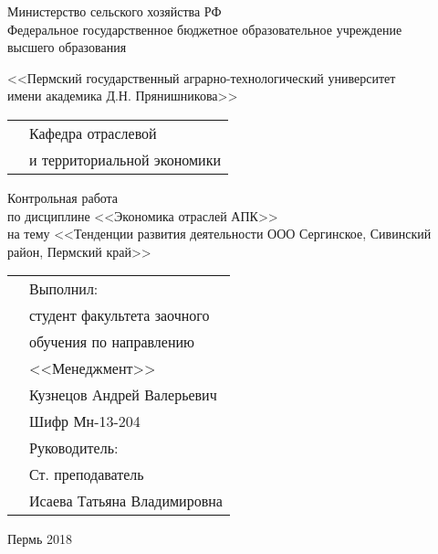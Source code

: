 
\thispagestyle{empty}
\begin{center}
	Министерство сельского хозяйства РФ \\Федеральное государственное бюджетное образовательное учреждение\\ высшего образования
	\vspace{0.5ex}
	
	<<Пермский государственный аграрно-технологический университет\\ имени академика Д.Н. Прянишникова>>
\end{center}
\vspace{10ex}
\begin{tabularx}{\textwidth}{XX}
	& Кафедра отраслевой \\
	& и территориальной экономики
\end{tabularx}
\begin{center}
	\vspace{10ex}
	Контрольная работа\\
	по дисциплине <<Экономика отраслей АПК>> \\
	\vspace{1ex}
	на тему <<Тенденции развития деятельности ООО Сергинское, Сивинский район, Пермский край>>
	
\end{center}
	\vspace{6ex}
	\begin{tabularx}{\textwidth}{XX}
	& Выполнил:\\
	& студент факультета заочного \\
	& обучения по направлению \\
	& <<Менеджмент>> \\
	& Кузнецов Андрей Валерьевич \\
	& Шифр Мн-13-204\\
	& Руководитель:\\
	& Ст. преподаватель\\
	& Исаева Татьяна Владимировна\\
	\end{tabularx}
\begin{center}
	\vfill
	Пермь 2018
\end{center}
